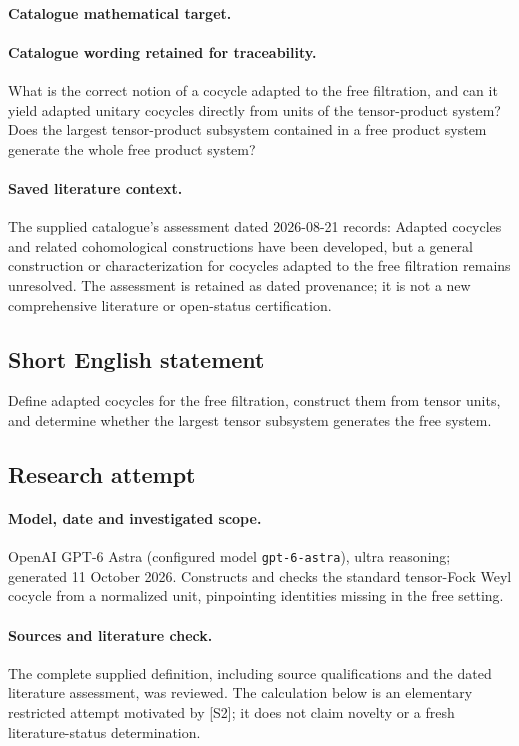 \documentclass[11pt]{article}
\begin{document}
\paragraph{Catalogue mathematical target.}
\paragraph{Catalogue wording retained for traceability.}
What is the correct notion of a cocycle adapted to the free filtration, and can it yield adapted unitary cocycles directly from units of the tensor-product system? Does the largest tensor-product subsystem contained in a free product system generate the whole free product system?

\paragraph{Saved literature context.} The supplied catalogue's assessment dated 2026-08-21 records: Adapted cocycles and related cohomological constructions have been developed, but a general construction or characterization for cocycles adapted to the free filtration remains unresolved. The assessment is retained as dated provenance; it is not a new comprehensive literature or open-status certification.
\subsection{Short English statement}
Define adapted cocycles for the free filtration, construct them from tensor units, and determine whether the largest tensor subsystem generates the free system.
\subsection{Research attempt}
\paragraph{Model, date and investigated scope.}
OpenAI GPT-6 Astra (configured model \texttt{gpt-6-astra}), ultra reasoning; generated 11 October 2026. Constructs and checks the standard tensor-Fock Weyl cocycle from a normalized unit, pinpointing identities missing in the free setting.

\paragraph{Sources and literature check.}
The complete supplied definition, including source qualifications and the dated literature assessment, was reviewed. The calculation below is an elementary restricted attempt motivated by [S2]; it does not claim novelty or a fresh literature-status determination.
\end{document}
